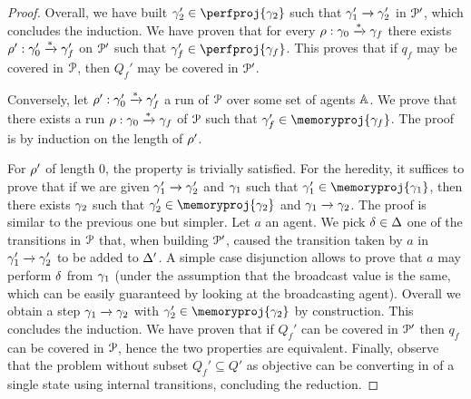 \begin{proof}
	Overall, we have built $\config_2' \in \perfproj{\config_2}$ such that $\gamma_1' \xrightarrow{} \gamma_2'$ in $\mathcal{P}'$, which concludes the induction. We have proven that for every $\rho: \gamma_0 \xrightarrow{*} \gamma_f$ there exists $\rho': \gamma_0' \xrightarrow{*} \gamma_f'$ on $\mathcal{P}'$ such that $\config_f' \in \perfproj{\config_f}$. This proves that if $q_f$ may be covered in $\mathcal{P}$, then $Q_f'$ may be covered in $\mathcal{P}'$. 

	Conversely, let $\rho' : \gamma_0' \xrightarrow{*} \gamma_f'$ a run of $\mathcal{P}$ over some set of agents $\mathbb{A}$. We prove that there exists a run $\rho: \gamma_0 \xrightarrow{*} \gamma_f$ of $\mathcal{P}$ such that $\config_f' \in \memoryproj{\config_f}$. The proof is by induction on the length of $\rho'$. 

	For $\rho'$ of length $0$, the property is trivially satisfied. For the heredity, it suffices to prove that if we are given $\gamma_1' \xrightarrow{} \gamma_2'$ and $\gamma_1$ such that $\config_1' \in \memoryproj{\config_1}$, then there exists $\gamma_2$ such that $\config_2' \in \memoryproj{\config_2}$ and $\gamma_1 \xrightarrow{} \gamma_2$. The proof is similar to the previous one but simpler. Let $a$ an agent. We pick $\delta \in \Delta$ one of the transitions in $\mathcal{P}$ that, when building $\mathcal{P}'$, caused the transition taken by $a$ in $\gamma_1' \xrightarrow{} \gamma_2'$ to be added to $\Delta'$. A simple case disjunction allows to prove that $a$ may perform $\delta$ from $\gamma_1$ (under the assumption that the broadcast value is the same, which can be easily guaranteed by looking at the broadcasting agent). Overall we obtain a step $\gamma_1 \xrightarrow{} \gamma_2$ with $\config_2' \in \memoryproj{\config_2}$ by construction. This concludes the induction. We have proven that if $Q_f'$ can be covered in $\mathcal{P}'$ then $q_f$ can be covered in $\mathcal{P}$, hence the two properties are equivalent.
	Finally, observe that the \COVER problem without subset $Q_f' \subseteq Q'$ as objective can be converting in \COVER of a single state using internal transitions, concluding the reduction.
\end{proof}
